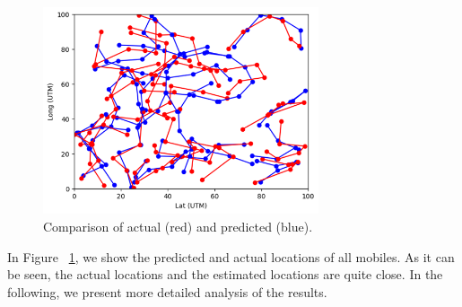 \documentclass[conference, 10pt]{IEEEtran}
\begin{document}
\begin{figure}[t]
\begin{center}
\includegraphics[height=2.4in,width=3.2in]{./Combined_path_illustration.png}
\caption{\label{fig:toyeg}
{\small Comparison of actual (red) and predicted (blue).}}
\end{center}
\end{figure}


In Figure ~\ref{fig:toyeg}, we show the predicted and actual locations of all mobiles. As it can be seen, the actual locations
and the estimated locations are quite close. In the following, we present more
detailed analysis of the results.
\end{document}
